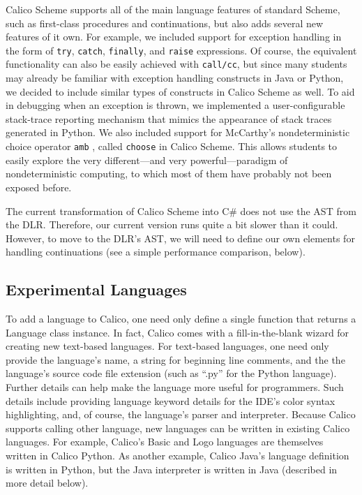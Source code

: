 \documentclass[preprint]{sigplanconf}
\begin{document}
Calico Scheme supports all of the main language features of standard Scheme,
such as first-class procedures and continuations, but also adds several new
features of it own.  For example, we included support for exception handling in
the form of \texttt{try}, \texttt{catch}, \texttt{finally}, and \texttt{raise}
expressions.  Of course, the equivalent functionality can also be easily
achieved with \texttt{call/cc}, but since many students may already be familiar
with exception handling constructs in Java or Python, we decided to include
similar types of constructs in Calico Scheme as well.  To aid in debugging when
an exception is thrown, we implemented a user-configurable stack-trace
reporting mechanism that mimics the appearance of stack traces generated in
Python.  We also included support for McCarthy's nondeterministic choice
operator \texttt{amb} \cite{AMB}, called \texttt{choose} in Calico Scheme.
This allows students to easily explore the very different---and very
powerful---paradigm of nondeterministic computing, to which most of them have
probably not been exposed before.

The current transformation of Calico Scheme into C\# does not use the
AST from the DLR. Therefore, our current version runs quite a bit
slower than it could. However, to move to the DLR's AST, we will need
to define our own elements for handling continuations (see a
simple performance comparison, below). 


\subsection{Experimental Languages}

To add a language to Calico, one need only define a single function
that returns a Language class instance. In fact, Calico comes with a
fill-in-the-blank wizard for creating new text-based languages. For
text-based languages, one need only provide the language's name, a
string for beginning line comments, and the the language's source code
file extension (such as ``.py'' for the Python language). Further
details can help make the language more useful for programmers. Such
details include providing language keyword details for the IDE's color
syntax highlighting, and, of course, the language's parser and
interpreter. Because Calico supports calling other language, new
languages can be written in existing Calico languages. For example,
Calico's Basic and Logo languages are themselves written in Calico
Python. As another example, Calico Java's language definition is
written in Python, but the Java interpreter is written in Java
(described in more detail below).
\end{document}
